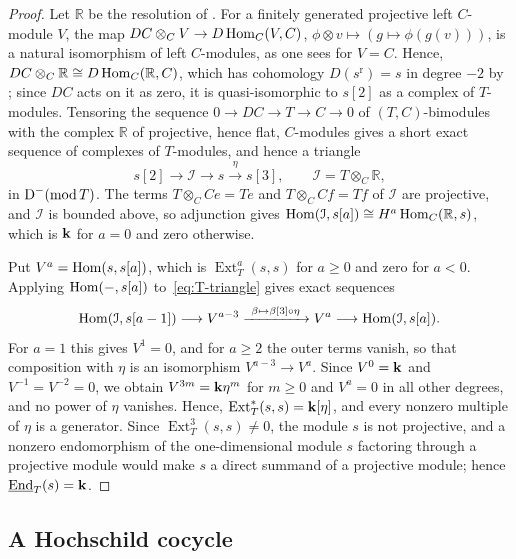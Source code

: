 \begin{proof}
  Let $\mathbb{R}$ be the resolution of . For a
  finitely generated projective left $C$-module $V$, the map
  ${DC\otimes_CV\to D\Hom[C]{V}{C}}$, ${\phi\otimes v\mapsto(g\mapsto\phi(g(v)))}$,
  is a natural isomorphism of left $C$-modules, as one sees for ${V=C}$. Hence,
  ${DC\otimes_C\mathbb{R}\cong D\Hom[C]{\mathbb{R}}{C}}$, which has cohomology
  ${D(s^{\mathrm{r}})=s}$ in degree ${-2}$ by ; since $DC$
  acts on it as zero, it is quasi-isomorphic to $s[2]$ as a complex of
  $T$-modules. Tensoring the sequence ${0\to DC\to T\to C\to0}$ of
  $(T,C)$-bimodules with the complex $\mathbb{R}$ of projective, hence flat,
  $C$-modules gives a short exact sequence of complexes of $T$-modules, and
  hence a triangle
  \begin{equation}
    \label{eq:T-triangle}
    s[2]\longrightarrow\mathcal{I}\longrightarrow s\xrightarrow{\ \eta\ }s[3],
    \qquad\mathcal{I}=T\otimes_C\mathbb{R},
  \end{equation}
  in ${\DerCat[-]{\operatorname{mod}T}}$. The terms ${T\otimes_CCe=Te}$ and
  ${T\otimes_CCf=Tf}$ of $\mathcal{I}$ are projective, and $\mathcal{I}$ is
  bounded above, so adjunction gives
  ${\Hom{\mathcal{I}}{s[a]}\cong H^a\Hom[C]{\mathbb{R}}{s}}$, which is $\mathbf{k}$ for
  ${a=0}$ and zero otherwise.

  Put ${V^a=\Hom{s}{s[a]}}$, which is $\operatorname{Ext}^a_T(s,s)$ for ${a\geq0}$
  and zero for ${a<0}$. Applying $\Hom{-}{s[a]}$ to~\eqref{eq:T-triangle} gives
  exact sequences
  \[
    \Hom{\mathcal{I}}{s[a-1]}\longrightarrow V^{a-3}
    \xrightarrow{\ \beta\mapsto\beta[3]\circ\eta\ }V^a\longrightarrow
    \Hom{\mathcal{I}}{s[a]}.
  \]
  For ${a=1}$ this gives ${V^1=0}$, and for ${a\geq2}$ the outer terms vanish, so
  that composition with $\eta$ is an isomorphism ${V^{a-3}\to V^a}$. Since
  ${V^0=\mathbf{k}}$ and ${V^{-1}=V^{-2}=0}$, we obtain ${V^{3m}=\mathbf{k}\eta^m}$ for ${m\geq0}$
  and ${V^a=0}$ in all other degrees, and no power of $\eta$ vanishes. Hence,
  ${\operatorname{Ext}^*_T(s,s)=\mathbf{k}[\eta]}$, and every nonzero multiple of $\eta$
  is a generator. Since ${\operatorname{Ext}^3_T(s,s)\neq0}$, the module $s$ is
  not projective, and a nonzero endomorphism of the one-dimensional module $s$
  factoring through a projective module would make $s$ a direct summand of a
  projective module; hence ${\underline{\operatorname{End}}_T(s)=\mathbf{k}}$.
\end{proof}

\subsection{A Hochschild cocycle}
\label{subsec:cocycle}

